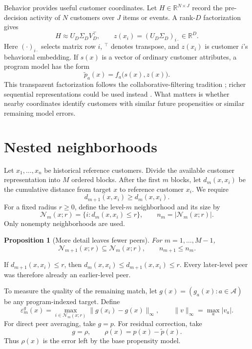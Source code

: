 \documentclass[10pt]{article}
\makeatletter
\theoremstyle{noteplain}
\newtheorem{proposition}[theorem]{Proposition}
\theoremstyle{definition}
\renewenvironment{proof}[1][\proofname]{\par
  \pushQED{\qed}%
  \normalfont \topsep4\p@\@plus4\p@\relax
  \trivlist
  \item[\hskip\labelsep\bfseries #1\@addpunct{.}]\ignorespaces
}{\popQED\endtrivlist\@endpefalse}
\newcommand{\cA}{\mathcal A}
\newcommand{\cN}{\mathcal N}
\makeatother
\begin{document}
Behavior provides useful customer coordinates. Let $H\in\mathbb R^{N\times J}$ record the pre-decision activity of $N$ customers over $J$ items or events. A rank-$D$ factorization gives
\[
 H\approx U_D\Sigma_DV_D^\top,
 \qquad z(x_i)=(U_D\Sigma_D)_{i\cdot}\in\mathbb R^D.
\]
Here $(\cdot)_{i\cdot}$ selects matrix row $i$, $^\top$ denotes transpose, and $z(x_i)$ is customer $i$'s behavioral embedding. If $s(x)$ is a vector of ordinary customer attributes, a program model has the form
\begin{equation}\label{eq:model}
 \widetilde p_a(x)=f_a\bigl(s(x),z(x)\bigr).
\end{equation}
This transparent factorization follows the collaborative-filtering tradition \cite{koren}; richer sequential representations could be used instead \cite{sasrec,bert4rec}. What matters is whether nearby coordinates identify customers with similar future propensities or similar remaining model errors.

\section{Nested neighborhoods}

Let $x_1,\ldots,x_n$ be historical reference customers. Divide the available customer representation into $M$ ordered blocks. After the first $m$ blocks, let $d_m(x,x_i)$ be the cumulative distance from target $x$ to reference customer $x_i$. We require
\[
 d_{m+1}(x,x_i)\ge d_m(x,x_i).
\]
For a fixed radius $r\ge0$, define the level-$m$ neighborhood and its size by
\begin{equation}\label{eq:neighborhood}
 \cN_m(x;r)=\{i:d_m(x,x_i)\le r\},
 \qquad n_m=|\cN_m(x;r)|.
\end{equation}
Only nonempty neighborhoods are used.

\begin{proposition}[More detail leaves fewer peers]\label{prop:thin}
For $m=1,\ldots,M-1$,
\[
 \cN_{m+1}(x;r)\subseteq\cN_m(x;r),
 \qquad n_{m+1}\le n_m.
\]
\end{proposition}

\begin{proof}
If $d_{m+1}(x,x_i)\le r$, then $d_m(x,x_i)\le d_{m+1}(x,x_i)\le r$. Every later-level peer was therefore already an earlier-level peer.
\end{proof}

To measure the quality of the remaining match, let $g(x)=(g_a(x):a\in\cA)$ be any program-indexed target. Define
\begin{equation}\label{eq:mismatch}
 \varepsilon_m^g(x)=
 \max_{i\in\cN_m(x;r)}\|g(x_i)-g(x)\|_\infty,
 \qquad \|v\|_\infty=\max_a|v_a|.
\end{equation}
For direct peer averaging, take $g=p$. For residual correction, take
\[
 g=\rho,
 \qquad \rho(x)=p(x)-\widetilde p(x).
\]
Thus $\rho(x)$ is the error left by the base propensity model.
\end{document}
